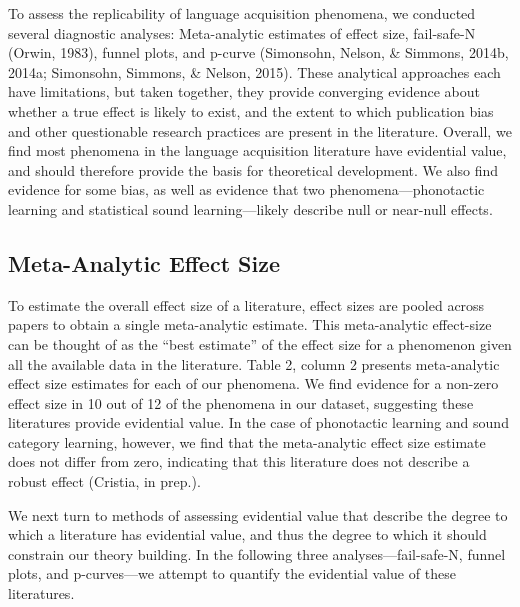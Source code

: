 \documentclass[english,floatsintext,man]{apa6}
\begin{document}
To assess the replicability of language acquisition phenomena, we
conducted several diagnostic analyses: Meta-analytic estimates of effect
size, fail-safe-N (Orwin, 1983), funnel plots, and p-curve (Simonsohn,
Nelson, \& Simmons, 2014b, 2014a; Simonsohn, Simmons, \& Nelson, 2015).
These analytical approaches each have limitations, but taken together,
they provide converging evidence about whether a true effect is likely
to exist, and the extent to which publication bias and other
questionable research practices are present in the literature. Overall,
we find most phenomena in the language acquisition literature have
evidential value, and should therefore provide the basis for theoretical
development. We also find evidence for some bias, as well as evidence
that two phenomena---phonotactic learning and statistical sound
learning---likely describe null or near-null effects.

\subsection{Meta-Analytic Effect Size}\label{meta-analytic-effect-size}

To estimate the overall effect size of a literature, effect sizes are
pooled across papers to obtain a single meta-analytic estimate. This
meta-analytic effect-size can be thought of as the \enquote{best
estimate} of the effect size for a phenomenon given all the available
data in the literature. Table 2, column 2 presents meta-analytic effect
size estimates for each of our phenomena. We find evidence for a
non-zero effect size in 10 out of 12 of the phenomena in our dataset,
suggesting these literatures provide evidential value. In the case of
phonotactic learning and sound category learning, however, we find that
the meta-analytic effect size estimate does not differ from zero,
indicating that this literature does not describe a robust effect
(Cristia, in prep.).

We next turn to methods of assessing evidential value that describe the
degree to which a literature has evidential value, and thus the degree
to which it should constrain our theory building. In the following three
analyses---fail-safe-N, funnel plots, and p-curves---we attempt to
quantify the evidential value of these literatures.
\end{document}
